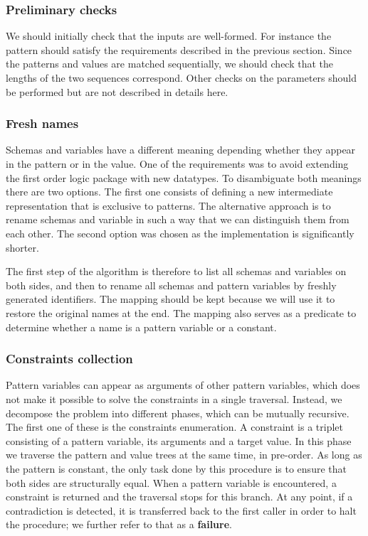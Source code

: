 \subsubsection{Preliminary checks}

We should initially check that the inputs are well-formed. For instance the pattern should satisfy the requirements described in the previous section. Since the patterns and values are matched sequentially, we should check that the lengths of the two sequences correspond. Other checks on the parameters should be performed but are not described in details here.

\subsubsection{Fresh names}

Schemas and variables have a different meaning depending whether they appear in the pattern or in the value. One of the requirements was to avoid extending the first order logic package with new datatypes. To disambiguate both meanings there are two options. The first one consists of defining a new intermediate representation that is exclusive to patterns. The alternative approach is to rename schemas and variable in such a way that we can distinguish them from each other. The second option was chosen as the implementation is significantly shorter.

The first step of the algorithm is therefore to list all schemas and variables on both sides, and then to rename all schemas and pattern variables by freshly generated identifiers. The mapping should be kept because we will use it to restore the original names at the end. The mapping also serves as a predicate to determine whether a name is a pattern variable or a constant.

\subsubsection{Constraints collection}

Pattern variables can appear as arguments of other pattern variables, which does not make it possible to solve the constraints in a single traversal. Instead, we decompose the problem into different phases, which can be mutually recursive. The first one of these is the constraints enumeration. A constraint is a triplet consisting of a pattern variable, its arguments and a target value. In this phase we traverse the pattern and value trees at the same time, in pre-order. As long as the pattern is constant, the only task done by this procedure is to ensure that both sides are structurally equal. When a pattern variable is encountered, a constraint is returned and the traversal stops for this branch. At any point, if a contradiction is detected, it is transferred back to the first caller in order to halt the procedure; we further refer to that as a \textbf{failure}.

